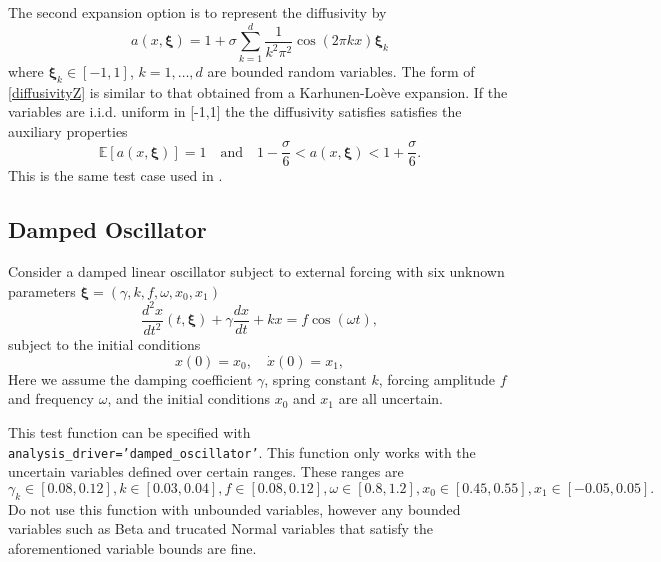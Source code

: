 The second expansion option is to represent the diffusivity by
\begin{equation}\label{diffusivityZ}
a(x,\boldsymbol{\xi})=1+\sigma\sum_{k=1}^d\frac{1}{k^2\pi^2}\cos(2\pi kx)\boldsymbol{\xi}_k
\end{equation}
where $\boldsymbol{\xi}_k\in[-1,1]$, $k=1,\ldots,d$ are bounded random variables. The form of \eqref{diffusivityZ} is
similar to that obtained from a Karhunen-Lo\`{e}ve expansion. If the
variables are i.i.d. uniform in [-1,1] the the diffusivity satisfies
satisfies the auxiliary properties
\begin{equation}
\mathbb{E}[a(x,\boldsymbol{\xi})]=1\quad\text{and}\quad 1-\frac{\sigma}{6}<a(x,\boldsymbol{\xi})<1+\frac{\sigma}{6}.
\end{equation}
This is the same test case used in \cite{xiu05}.


\subsection{Damped Oscillator}
Consider a damped linear oscillator subject to external forcing
with six unknown parameters $\boldsymbol{\xi}=(\gamma,k,f,\omega,x_0,x_1)$
\begin{equation}\label{eq:oscillator_ode}
\frac{d^2x}{dt^2}(t,\boldsymbol{\xi})+\gamma\frac{dx}{dt}+k x=f\cos(\omega t),
\end{equation}
subject to the initial conditions
\begin{equation}
x(0)=x_0,\quad \dot{x}(0)=x_1,
\end{equation}
Here we assume the damping coefficient $\gamma$, spring constant $k$,
forcing amplitude $f$ and frequency $\omega$, and the initial
conditions $x_0$ and $x_1$ are all uncertain.

This test function can be specified with {\tt
  analysis\_driver='damped\_oscillator'}. This function only works with
the uncertain variables defined over certain ranges. These ranges
are
$$\gamma_k\in[0.08,0.12],k\in[0.03,0.04],f\in[0.08,0.12],\omega\in[0.8,1.2],x_0\in[0.45,0.55],x_1\in[-0.05,0.05].$$
Do not use this function with unbounded variables, however any
bounded variables such as Beta and trucated Normal variables that
satisfy the aforementioned variable bounds are fine.

